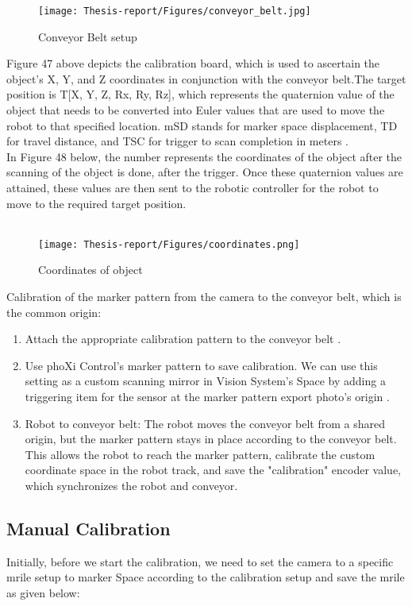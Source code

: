 \documentclass[12pt]{article}
\begin{document}
\begin{figure}[h]
    \centering
    \texttt{[image: Thesis-report/Figures/conveyor\_belt.jpg]} 
    \caption{Conveyor Belt setup \cite{ref21}}
    \label{fig:Photoneo Cmaera}
\end{figure}
Figure 47 above depicts the calibration board, which is used to ascertain the object's X, Y, and Z coordinates in conjunction with the conveyor belt.The target position is T[X, Y, Z, Rx, Ry, Rz], which represents the quaternion value of the object that needs to be converted into Euler values that are used to move the robot to that specified location. mSD stands for marker space displacement, TD for travel distance, and TSC for trigger to scan completion in meters \cite{ref21}. \\


In Figure 48 below, the number represents the coordinates of the object after the scanning of the object is done, after the trigger. Once these quaternion values are attained, these values are then sent to the robotic controller for the robot to move to the required target position.\\\\
\begin{figure}[h]
    \centering
    \texttt{[image: Thesis-report/Figures/coordinates.png]} 
    \caption{Coordinates of object}
    \label{fig1.Photoneo Cmaera}
\end{figure}

Calibration of the marker pattern from the camera to the conveyor belt, which is the common origin:
\begin{enumerate}
    \item Attach the appropriate calibration pattern to the conveyor belt \cite{ref21}.
    \item Use phoXi Control's marker pattern to save calibration. We can use this setting as a custom scanning mirror in Vision System's Space by adding a triggering item for the sensor at the marker pattern export photo's origin \cite{ref21}.
    \item Robot to conveyor belt: The robot moves the conveyor belt from a shared origin, but the marker pattern stays in place according to the conveyor belt. This allows the robot to reach the marker pattern, calibrate the custom coordinate space in the robot track, and save the "calibration" encoder value, which synchronizes the robot and conveyor\cite{ref21}. 
\end{enumerate}

\subsection{Manual Calibration}
Initially, before we start the calibration, we need to set the camera to a specific mrile setup to marker Space according to the calibration setup and save the mrile as given below: \cite{ref2}
\end{document}
